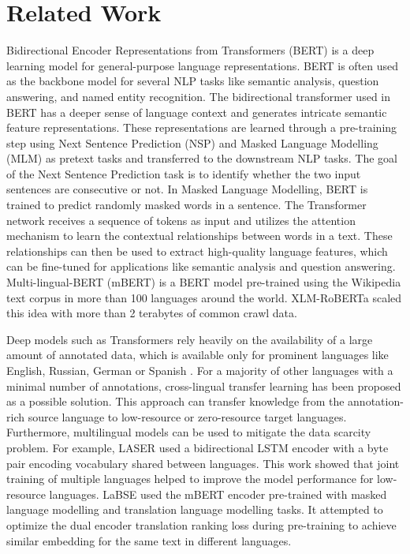 \documentclass[11pt]{article}
\begin{document}
\section{Related Work}
Bidirectional Encoder Representations from Transformers (BERT) \cite{devlin2018bert} is a deep learning model for general-purpose language representations. BERT is often used as the backbone model for several NLP tasks like semantic analysis, question answering, and named entity recognition. The bidirectional transformer used in BERT has a deeper sense of language context and generates intricate semantic feature representations. These representations are learned through a pre-training step using Next Sentence Prediction (NSP) and Masked Language Modelling (MLM) as pretext tasks and transferred to the downstream NLP tasks. The goal of the Next Sentence Prediction task is to identify whether the two input sentences are consecutive or not. In Masked Language Modelling, BERT is trained to predict randomly masked words in a sentence. The Transformer network receives a sequence of tokens as input and utilizes the attention mechanism to learn the contextual relationships between words in a text. These relationships can then be used to extract high-quality language features, which can be fine-tuned for applications like semantic analysis and question answering. Multi-lingual-BERT (mBERT) is a BERT model pre-trained using the Wikipedia text corpus \cite{wiki100} in more than 100 languages around the world. XLM-RoBERTa \cite{conneau2020unsupervised} scaled this idea with more than 2 terabytes of common crawl data.

Deep models such as Transformers rely heavily on the availability of a large amount of annotated data, which is available only for prominent languages like English, Russian, German or Spanish \cite{ponti2019modeling, joshi2020state}. For a majority of other languages with a minimal number of annotations, cross-lingual transfer learning \cite{prettenhofer2011cross, wan2011bi, ruder2019survey} has been proposed as a possible solution. This approach can transfer knowledge from the annotation-rich source language to low-resource or zero-resource target languages. Furthermore, multilingual models \cite{lewis2019mlqa, clark2020tydi} can be used to mitigate the data scarcity problem. For example, LASER \cite{artetxe2019massively} used a bidirectional LSTM  \cite{10.1162/neco.1997.9.8.1735} encoder with a byte pair encoding vocabulary shared between languages. This work showed that joint training of multiple languages helped to improve the model performance for low-resource languages. LaBSE \cite{feng2020language} used the mBERT \cite{devlin2018bert} encoder pre-trained with masked language modelling and translation language modelling \cite{lample2019cross} tasks. It attempted to optimize the dual encoder translation ranking \cite{guo-etal-2018-effective} loss during pre-training to achieve similar embedding for the same text in different languages.
\end{document}
